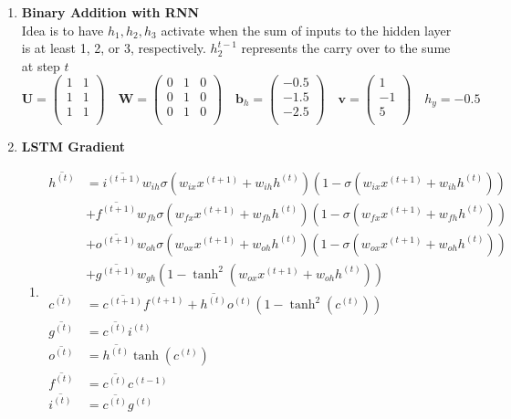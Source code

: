 \documentclass[11pt]{article}
\begin{document}
 
\begin{enumerate} 

\item \textbf{Binary Addition with RNN} \\ 
Idea is to have $h_1,h_2,h_3$ activate when the sum of inputs to the hidden layer is at least 1, 2, or 3, respectively. $h_2^{t-1}$ represents the carry over to the sume at step $t$
\[
	\mathbf{U} = 
    \begin{pmatrix}
    1 & 1 \\
    1 & 1 \\
    1 & 1 \\
    \end{pmatrix}
    \quad
    \mathbf{W} = 
    \begin{pmatrix}
    	0 & 1 & 0 \\
        0 & 1 & 0 \\ 
        0 & 1 & 0 \\
    \end{pmatrix}
    \quad 
    \mathbf{b}_h = 
    \begin{pmatrix}
    	-0.5 \\ 
        -1.5 \\ 
        -2.5 \\
    \end{pmatrix}
    \quad 
    \mathbf{v} = 
    \begin{pmatrix}
    	1 \\ -1 \\ 5 \\
    \end{pmatrix}
    \quad 
    h_y = -0.5
\]


\item\textbf{LSTM Gradient}

\begin{enumerate}
\item  
\begin{align*}
    \overline{h^{(t)}} 
    &= \overline{i^{(t+1)}} w_{ih} \sigma(w_{ix}x^{(t+1)} + w_{ih}h^{(t)})(1 - \sigma(w_{ix}x^{(t+1)} + w_{ih}h^{(t)})) \\
    & + \overline{f^{(t+1)}} w_{fh} \sigma(w_{fx}x^{(t+1)} + w_{fh}h^{(t)})(1 - \sigma(w_{fx}x^{(t+1)} + w_{fh}h^{(t)})) \\
    & + \overline{o^{(t+1)}} w_{oh} \sigma(w_{ox}x^{(t+1)} + w_{oh}h^{(t)})(1 - \sigma(w_{ox}x^{(t+1)} + w_{oh}h^{(t)})) \\
    & + \overline{g^{(t+1)}} w_{gh}(1 - \tanh^2 (w_{ox}x^{(t+1)} + w_{oh}h^{(t)})) \\
    \overline{c^{(t)}} &= \overline{c^{(t+1)}} f^{(t+1)} + \overline{h^{(t)}} o^{(t)} (1 - \tanh^2 (c^{(t)})) \\
    \overline{g^{(t)}} &= \overline{c^{(t)}} i^{(t)} \\
    \overline{o^{(t)}} &= \overline{h^{(t)}} \tanh (c^{(t)}) \\
    \overline{f^{(t)}} &= \overline{c^{(t)}} c^{(t-1)} \\
    \overline{i^{(t)}} &= \overline{c^{(t)}} g^{(t)} \\
\end{align*}



\end{enumerate}
\end{enumerate}
\end{document}
